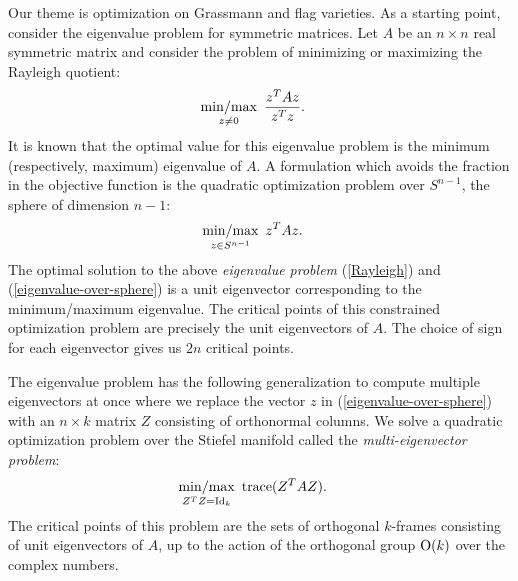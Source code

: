 \documentclass[12pt]{extarticle}
\theoremstyle{definition}
\numberwithin{theorem}{section}
\newcommand{\minmax}{\mathop{{\rm min/max}}}
\begin{document}
Our theme is optimization on Grassmann and flag varieties. As a starting point, consider the eigenvalue problem for symmetric matrices. Let $A$ be an $n \times n$ real symmetric matrix and consider the problem of minimizing or maximizing the Rayleigh quotient: 
\begin{align} \label{Rayleigh}
    \minmax_{z \neq 0}
    & \,\,\, \frac{z^T A z}{z^Tz}.
\end{align}
It is known that the optimal value for this eigenvalue problem is the minimum (respectively, maximum) eigenvalue of $A$. A formulation which avoids the fraction in the objective function is the quadratic optimization problem over  $S^{n-1}$, the sphere of dimension $n-1$:
\begin{align} \label{eigenvalue-over-sphere}
    \minmax_{z \in S^{n-1}}
    & \,\,\, z^T A z.
\end{align}
The optimal solution to the above {\it eigenvalue problem} (\ref{Rayleigh}) and (\ref{eigenvalue-over-sphere}) is a unit eigenvector corresponding to the minimum/maximum eigenvalue. 
The critical points of this constrained optimization problem are precisely the unit eigenvectors of $A$. 
The choice of sign for each eigenvector gives us $2n$ critical points.

The eigenvalue problem has the following generalization to compute multiple eigenvectors at once  
where we replace the vector $z$ in (\ref{eigenvalue-over-sphere}) with an $n \times k$ matrix $Z$ consisting of orthonormal columns. We solve a quadratic optimization problem over the Stiefel manifold called the \emph{multi-eigenvector problem}:
\begin{align} \label{multi-eigenvector}
    \minmax_{Z^TZ = {\rm Id}_k}
    & \,\,\, {\rm trace}(Z^T A Z).
\end{align}
The critical points of this problem are the sets of orthogonal $k$-frames consisting of unit eigenvectors of $A$, up to the action
of the orthogonal group ${\rm O}(k)$ over the complex numbers. 
\end{document}
